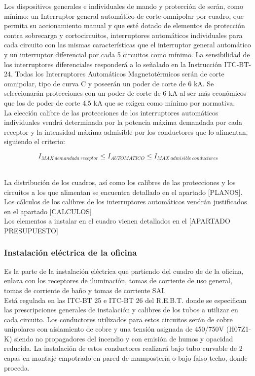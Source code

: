 Los dispositivos generales e individuales de mando y protección de serán, como mínimo: un Interruptor general automático de corte omnipolar por cuadro, que permita su accionamiento manual y que esté dotado de elementos de protección contra sobrecarga y cortocircuitos, interruptores automáticos individuales para cada circuito con las mismas características que el interruptor general automático y un interruptor diferencial por cada 5 circuitos como mínimo. La sensibilidad de los interruptores diferenciales responderá a lo señalado en la Instrucción ITC-BT-24. Todas los Interruptores Automáticos Magnetotérmicos serán de corte omnipolar, tipo de curva C y poseerán un poder de corte de 6 kA. Se seleccionarán protecciones con un poder de corte de 6 kA al ser más económicos que los de poder de corte 4,5 kA que se exigen como mínimo por normativa.\\

La elección calibre de las protecciones de los interruptores automáticos individuales vendrá determinada por la potencia máxima demandada por cada receptor y la intensidad máxima admisible por los conductores que lo alimentan, siguiendo el criterio:\

$$ I_{MAX\ demandada\ receptor}\leq I_{AUTOMATICO}\leq I_{MAX\ admisible\ conductores}$$\

La distribución de los cuadros, así como los calibres de las protecciones y los circuitos a los que alimentan se encuentra detallado en el apartado [PLANOS]. Los cálculos de los calibres de los interruptores automáticos vendrán justificados en el apartado [CALCULOS]\\

Los elementos a instalar en el cuadro vienen detallados en el [APARTADO PRESUPUESTO]\

\subsubsection{Instalación eléctrica de la oficina}

Es la parte de la instalación eléctrica que partiendo del cuadro de de la oficina, enlaza con los receptores de iluminación, tomas de corriente de uso general, tomas de corriente de baño y tomas de corriente SAI.\\

Está regulada en las ITC-BT 25 e ITC-BT 26 del R.E.B.T. donde se especifican las prescripciones generales de instalación y calibres de los tubos a utilizar en cada circuito. Los conductores utilizados para estos circuitos serán de cobre unipolares con aislamiento de cobre y una tensión asignada de 450/750V (H07Z1-K) siendo no propagadores del incendio y con emisión de humos y opacidad reducida. La instalación de estos conductores realizará bajo tubo curvable de 2 capas en montaje empotrado en pared de mampostería o bajo falso techo, donde proceda.\\

